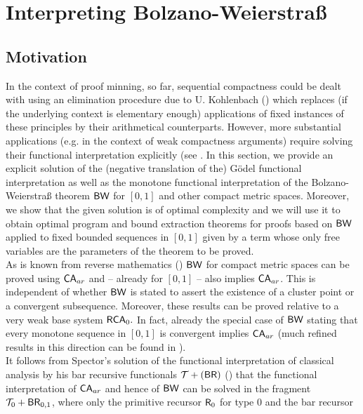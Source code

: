 \section{Interpreting Bolzano-Weierstra{\ss}} \label{s:bw}

\subsection*{Motivation}
In the context of proof minning, so far, 
sequential compactness could be dealt with using an elimination 
procedure due to U. Kohlenbach 
(\cite{Kohlenbach1998,Kohlenbach_gp,Kohlenbach98,Kohlenbach00}) 
which replaces (if the underlying context is elementary enough) applications 
of fixed instances of these principles by their arithmetical counterparts. 
However, 
more substantial applications (e.g. in the context of 
weak compactness arguments) require solving their functional interpretation explicitly
(see \cite{KohlenbachMints,Kohlenbach(Baillon)}. 
In this section, we provide an explicit solution of the (negative translation of the) 
G\"odel functional 
interpretation as 
well as the monotone functional interpretation of the Bolzano-Weierstra\ss{} 
theorem $\textsf{\upshape BW}$ for $[0,1]$ and other compact metric spaces. Moreover, we show  
that the given solution is of optimal complexity and we will use it to 
obtain optimal program and bound extraction theorems for proofs based on 
$\textsf{\upshape BW}$ applied to 
fixed bounded sequences in $[0,1]$ 
given by a term whose only free variables are the parameters 
of the theorem to be proved. 
\\[1mm]   
As is known from reverse mathematics (\cite{Simpson99}) $\textsf{\upshape BW}$ for 
compact metric spaces can be 
proved using $\textsf{\upshape CA}_{ar}$ and -- already for $[0,1]$ -- 
also implies $\textsf{\upshape CA}_{ar}$. This is independent of whether 
$\textsf{\upshape BW}$ is stated to assert the existence of a cluster point or a convergent 
subsequence. Moreover, these results can be proved
 relative to a very weak base system $\textsf{\upshape RCA}_0.$ In fact, already 
the special case of $\textsf{\upshape BW}$ stating that every monotone sequence in $[0,1]$ is 
convergent implies $\textsf{\upshape CA}_{ar}$ (much refined results in this direction can be 
found in \cite{Kohlenbach00}). 
\\[1mm] It follows from Spector's solution of the functional 
interpretation of classical analysis by his bar recursive functionals 
$\mathcal{T}+(\textsf{\upshape BR})$ 
(\cite{Spector62})  that the functional interpretation 
of $\textsf{\upshape CA}_{ar}$ and hence of $\textsf{\upshape BW}$ can be solved in the fragment $\mathcal{T}_0+\textsf{\upshape BR}_{0,1}$, 
where only the primitive recursor $\textsf{\upshape R}_0$ for type $0$ and the bar recursor 
